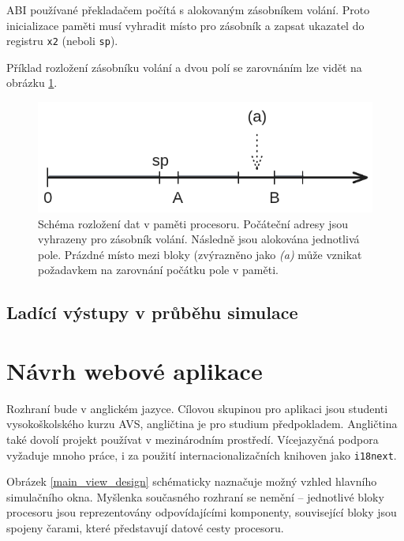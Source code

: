 ABI používané překladačem počítá s alokovaným zásobníkem volání.
Proto inicializace paměti musí vyhradit místo pro zásobník a zapsat ukazatel do registru \texttt{x2} (neboli \texttt{sp}).

Příklad rozložení zásobníku volání a dvou polí se zarovnáním lze vidět na obrázku \ref{memlayout_schema}.

\begin{figure}[hbtp]
\centering
    \includegraphics[width=13cm]{obrazky-figures/memlayout.png}
    \caption{Schéma rozložení dat v paměti procesoru. Počáteční adresy jsou vyhrazeny pro zásobník volání. Následně jsou alokována jednotlivá pole. Prázdné místo mezi bloky (zvýrazněno jako \emph{(a)} může vznikat požadavkem na zarovnání počátku pole v paměti.} 
    \label{memlayout_schema}
\end{figure}

\subsection{Ladící výstupy v průběhu simulace}

\section{Návrh webové aplikace}

Rozhraní bude v anglickém jazyce.
Cílovou skupinou pro aplikaci jsou studenti vysokoškolského kurzu AVS, angličtina je pro studium předpokladem.
Angličtina také dovolí projekt používat v mezinárodním prostředí. 
Vícejazyčná podpora vyžaduje mnoho práce, i za použití internacionalizačních knihoven jako \texttt{i18next}.

Obrázek \ref{main_view_design} schématicky naznačuje možný vzhled hlavního simulačního okna.
Myšlenka současného rozhraní se nemění -- jednotlivé bloky procesoru jsou reprezentovány odpovídajícími komponenty, související bloky jsou spojeny čarami, které představují datové cesty procesoru.

